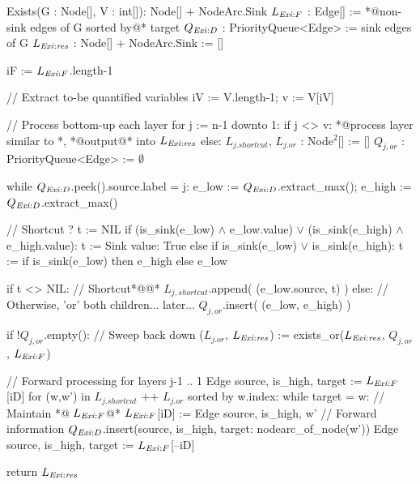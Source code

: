 \begin{blstlisting}
  Exists(G : Node[], V : int[]): Node[] + NodeArc.Sink
    $\ExistsLforward$ : Edge[] :=      *@non-sink edges of G sorted by@* target
    $\ExistsQdep$ : PriorityQueue<Edge> :=      {sink edges of G}
    $\ExistsLres$ : Node[] + NodeArc.Sink :=     []

    iF := $\ExistsLforward$.length-1
    
    // Extract to-be quantified variables
    iV := V.length-1; v := V[iV]

    // Process bottom-up each layer
    for j := n-1 downto 1:
      if j <> v:
        *@process layer similar to \Reduce@*, *@output@* into $\ExistsLres$
      else:
        $L_{j.\mathit{shortcut}}$, $L_{j.\mathit{or}}$ : Node$^2$[] :=    []
        $Q_{j,\mathit{or}}$ : PriorityQueue<Edge> :=    $\emptyset$
        
        while $\ExistsQdep$.peek().source.label = j:
          e_low := $\ExistsQdep$.extract_max(); e_high := $\ExistsQdep$.extract_max()

          // Shortcut ?
          t := NIL
          if (is_sink(e_low) $\land$ e_low.value) $\lor$
             (is_sink(e_high) $\land$ e_high.value):
            t := Sink{ value: True }
          else if is_sink(e_low) $\lor$ is_sink(e_high):
            t := if is_sink(e_low) then e_high else e_low

          if t <> NIL: // Shortcut*@\color{cGray}{!}@*
            $L_{j,\mathit{shortcut}}$.append( (e_low.source, t) )
          else: // Otherwise, 'or' both children... later...
            $Q_{j,\mathit{or}}$.insert( (e_low, e_high) )

        if !$Q_{j,\mathit{or}}$.empty(): // Sweep back down
          ($L_{j.\mathit{or}}$, $\ExistsLres$) := exists_or($\ExistsLres$, $Q_{j,\mathit{or}}$, $\ExistsLforward$)

        // Forward processing for layers j-1 .. 1
        Edge{ source, is_high, target } := $\ExistsLforward$[iD]
        for (w,w') in $L_{j.\mathit{shortcut}}$ ++ $L_{j.\mathit{or}}$ sorted by w.index:
          while target = w:
            // Maintain *@\color{gray} $\ExistsLforward$@*
            $\ExistsLforward$[iD] :=     Edge{ source, is_high, w' }
            // Forward information
            $\ExistsQdep$.insert({source, is_high, target: nodearc_of_node(w')})
            Edge{ source, is_high, target } := $\ExistsLforward$[--iD]
          
    return $\ExistsLres$
\end{blstlisting}
